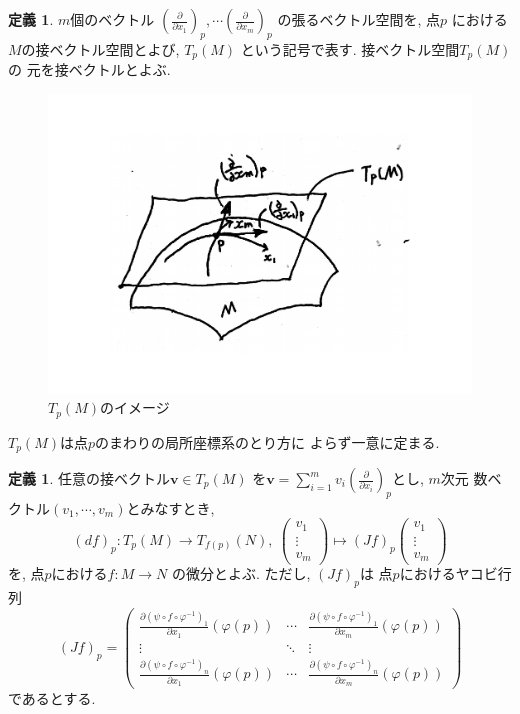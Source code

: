 \documentclass[twocolumn]{jarticle}
\theoremstyle{definition}
\newtheorem{definition}[theorem]{定義}
\begin{document}
\begin{definition}\label{def:tangent vector space}
  $m$個のベクトル
  $\left(\frac{\partial}{\partial x_1}\right)_p, 
  \cdots 
  \left(\frac{\partial}{\partial x_m}\right)_p$
  の張るベクトル空間を, 点$p$
  における$M$の接ベクトル空間とよび, 
  $T_p(M)$
  という記号で表す. 接ベクトル空間$T_p(M)$の
  元を接ベクトルとよぶ. 
\end{definition}
\begin{figure}[H]
      \centering
      \includegraphics[keepaspectratio, scale=0.28]{tangentVectorSpace_2.pdf}
      \caption{$T_p(M)$のイメージ}
      \label{}
\end{figure}
$T_p(M)$は点$p$のまわりの局所座標系のとり方に
よらず一意に定まる. 
\begin{definition}\label{def:differential}
  任意の接ベクトル$\boldsymbol{v}\in T_p(M)$
  を$\boldsymbol{v}=
  \sum_{i=1}^{m}v_i\left(\frac{\partial}
  {\partial x_i}\right)_p$とし, $m$次元
  数ベクトル$(v_1,\cdots ,v_m)$とみなすとき, 
   $$(df)_p:T_p(M)\to T_{f(p)}(N),\ 
  \begin{pmatrix}
    v_1\\
    \vdots \\
    v_m
  \end{pmatrix}
  \mapsto
  (Jf)_p
  \begin{pmatrix}
    v_1\\
    \vdots \\
    v_m
  \end{pmatrix}$$
  を, 点$p$における$f:M\to N$
  の微分とよぶ. ただし, $(Jf)_p$は
  点$p$におけるヤコビ行列
  $$(Jf)_p=
  \left(
  \begin{array}{ccc}
    \frac{\partial (\psi\circ f\circ \varphi^{-1})_1}{\partial x_1}(\varphi(p))&\cdots &\frac{\partial (\psi\circ f\circ \varphi^{-1})_1}{\partial x_m}(\varphi(p))\\
    \vdots &\ddots& \vdots \\
    \frac{\partial (\psi\circ f\circ \varphi^{-1})_n}{\partial x_1}(\varphi(p))&\cdots &\frac{\partial (\psi\circ f\circ \varphi^{-1})_n}{\partial x_m}(\varphi(p)) 
  \end{array} 
  \right)$$
  であるとする. 
\end{definition}
\end{document}

